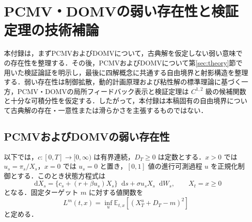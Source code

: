 \documentclass[10pt,a4paper]{article}
\theoremstyle{plain}
\theoremstyle{definition}
\newcommand{\E}{\mathbb{E}}
\newcommand{\dd}{\mathop{}\!\mathrm{d}}
\begin{document}
\section{PCMV・DOMVの弱い存在性と検証定理の技術補論}
\label{app:technical-proofs}

本付録は，まずPCMVおよびDOMVについて，古典解を仮定しない弱い意味での存在性を整理する．その後，PCMVおよびDOMVについて第\ref{sec:theory}節で用いた検証論証を明示し，最後に四解概念に共通する自由境界と射影構造を整理する．弱い存在性は制御拡散，動的計画原理および粘性解の標準理論に基づく一方，PCMV・DOMVの局所フィードバック表示と検証定理は $C^{1,2}$ 級の候補関数と十分な可積分性を仮定する．したがって，本付録は本稿固有の自由境界について古典解の存在・一意性または滑らかさを主張するものではない．

\subsection{PCMVおよびDOMVの弱い存在性}
\label{app:pcmv-domv-existence}

以下では，$c:[0,T]\to[0,\infty)$ は有界連続，$D_T\geq0$ は定数とする．$x>0$ では $u_s=\pi_s/X_s$，$x=0$ では $u_s=0$ と置き，$[0,1]$ 値の進行可測過程 $u$ を正規化制御とする．このとき状態方程式は
\begin{equation}
 \dd X_s=\{c_s+(r+\beta u_s)X_s\}\dd s+\sigma u_sX_s\dd W_s,
 \qquad X_t=x\geq0
 \label{eq:normalized-controlled-state}
\end{equation}
となる．固定ターゲット $m$ に対する値関数を
\begin{equation}
 L^m(t,x)=\inf_{u}\E_{t,x}\!\left[(X_T^u+D_T-m)^2\right]
 \label{eq:app-weak-value}
\end{equation}
と定める．
\end{document}
